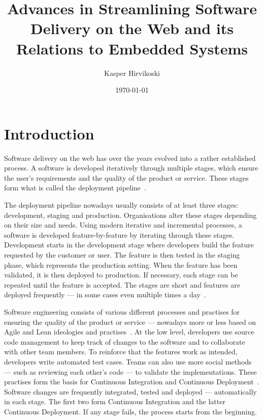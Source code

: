 \documentclass[english]{tktltiki2}
\title{Advances in Streamlining Software Delivery on the Web and its Relations to Embedded Systems}
\author{Kasper Hirvikoski}
\date{\today}
\begin{document}

\frontmatter

\maketitle
\setcounter{page}{2}
\makeabstract

\tableofcontents


\mainmatter


\section{Introduction}

Software delivery on the web has over the years evolved into a rather established process. A software is developed iteratively through multiple stages, which ensure the user’s requirements and the quality of the product or service. These stages form what is called the deployment pipeline~\cite{Fow06, HF11, Fow13a, Fow13b}.

The deployment pipeline nowadays usually consists of at least three stages: development, staging and production. Organisations alter these stages depending on their size and needs. Using modern iterative and incremental processes, a software is developed feature-by-feature by iterating through these stages. Development starts in the development stage where developers build the feature requested by the customer or user. The feature is then tested in the staging phase, which represents the production setting. When the feature has been validated, it is then deployed to production. If necessary, each stage can be repeated until the feature is accepted. The stages are short and features are deployed frequently — in some cases even multiple times a day~\cite{OR11, Sny13, Rub14}.

Software engineering consists of various different processes and practises for ensuring the quality of the product or service — nowadays more or less based on Agile and Lean ideologies and practises~\cite{Ono88, BBB01a, Fow05, Mon12}. At the low level, developers use source code management to keep track of changes to the software and to collaborate with other team members. To reinforce that the features work as intended, developers write automated test cases. Teams can also use more social methods — such as reviewing each other’s code — to validate the implementations. These practises form the basis for Continuous Integration and Continuous Deployment~\cite{Fow06, HF11, Fow13a, Fow13b}. Software changes are frequently integrated, tested and deployed — automatically in each stage. The first two form Continuous Integration and the latter Continuous Deployment. If any stage fails, the process starts from the beginning.
\end{document}
